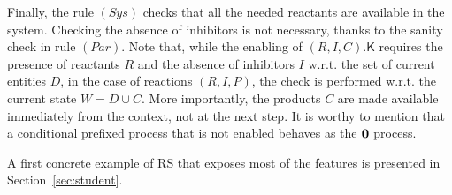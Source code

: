 Finally, the rule $(\textit{Sys})$ checks that all the needed reactants are available in the system. Checking the absence of inhibitors  is not necessary, thanks to the sanity check in rule $(\textit{Par})$.
Note that, while the enabling of $(R,I,C).\mathsf{K}$ requires the presence of reactants $R$ and the absence of inhibitors $I$ w.r.t. the set of current entities $D$, in the case of reactions $(R,I,P)$, the check is performed w.r.t. the current state $W=D\cup C$.
More importantly, the products $C$ are made available immediately from the context, not at the next step.
It is worthy to mention that a conditional prefixed process that is not enabled behaves as the $\mathbf{0}$ process.

A first concrete example of RS that exposes most of the features is presented in Section~\ref{sec:student}.

